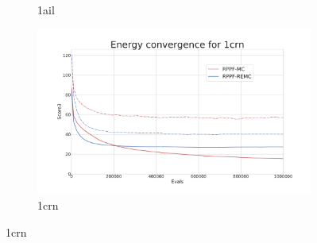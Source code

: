 \begin{figure}[ht]
\begin{subfigure}{0.7\linewidth}
    \caption{1ail}
  \end{subfigure}
%
  \begin{subfigure}{0.7\linewidth}
    \centering
    \includegraphics[width=1\linewidth]{Figuras/plots/energy_convergence/energy_convergence_1crn.pdf}
    \caption{1crn}
  \end{subfigure}
\end{figure}


